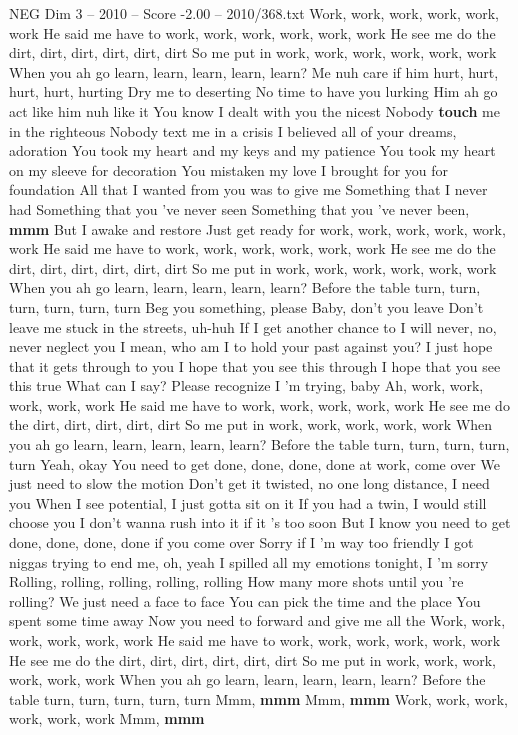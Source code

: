 \begin{textsample}{NEG Dim 3 – 2010 – Score -2.00 – 2010/368.txt}  \label{ex:f3_neg_026}
Work, work, work, work, work, work He said me have to work, work, work, work, work, work He see me do the dirt, dirt, dirt, dirt, dirt, dirt So me put in work, work, work, work, work, work When you ah go learn, learn, learn, learn, learn?
Me nuh care if him hurt, hurt, hurt, hurt, hurting Dry me to deserting No time to have you lurking Him ah go act like him nuh like it You know I dealt with you the nicest Nobody \textbf{touch} me in the righteous Nobody text me in a crisis I believed all of your dreams, adoration You took my heart and my keys and my patience You took my heart on my sleeve for decoration You mistaken my love I brought for you for foundation All that I wanted from you was to give me Something that I never had Something that you 've never seen Something that you 've never been, \textbf{mmm} But I awake and restore Just get ready for work, work, work, work, work, work He said me have to work, work, work, work, work, work He see me do the dirt, dirt, dirt, dirt, dirt, dirt So me put in work, work, work, work, work, work When you ah go learn, learn, learn, learn, learn?
Before the table turn, turn, turn, turn, turn, turn Beg you something, please Baby, don't you leave Don't leave me stuck in the streets, uh-huh If I get another chance to I will never, no, never neglect you I mean, who am I to hold your past against you?
I just hope that it gets through to you I hope that you see this through I hope that you see this true What can I say?
Please recognize I 'm trying, baby Ah, work, work, work, work, work He said me have to work, work, work, work, work He see me do the dirt, dirt, dirt, dirt, dirt So me put in work, work, work, work, work When you ah go learn, learn, learn, learn, learn?
Before the table turn, turn, turn, turn, turn Yeah, okay You need to get done, done, done, done at work, come over We just need to slow the motion Don't get it twisted, no one long distance, I need you When I see potential, I just gotta sit on it If you had a twin, I would still choose you I don't wanna rush into it if it 's too soon But I know you need to get done, done, done, done if you come over Sorry if I 'm way too friendly I got niggas trying to end me, oh, yeah I spilled all my emotions tonight, I 'm sorry Rolling, rolling, rolling, rolling, rolling How many more shots until you 're rolling?
We just need a face to face You can pick the time and the place You spent some time away Now you need to forward and give me all the Work, work, work, work, work, work He said me have to work, work, work, work, work, work He see me do the dirt, dirt, dirt, dirt, dirt, dirt So me put in work, work, work, work, work, work When you ah go learn, learn, learn, learn, learn?
Before the table turn, turn, turn, turn, turn Mmm, \textbf{mmm} Mmm, \textbf{mmm} Work, work, work, work, work, work Mmm, \textbf{mmm}

\end{textsample}
